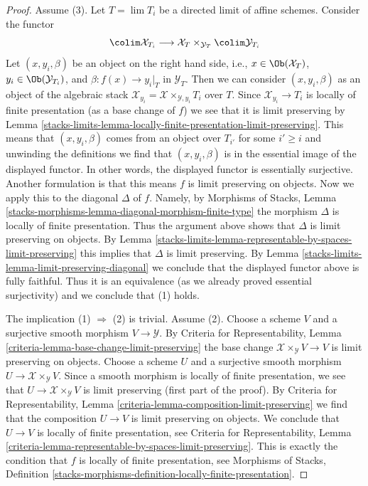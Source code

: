 \begin{proof}
Assume (3). Let $T = \lim T_i$ be a directed limit of affine schemes.
Consider the functor
$$
\colim \mathcal{X}_{T_i} \longrightarrow
\mathcal{X}_T \times_{\mathcal{Y}_T} \colim \mathcal{Y}_{T_i}
$$
Let $(x, y_i, \beta)$ be an object on the right hand side, i.e.,
$x \in \Ob(\mathcal{X}_T)$, $y_i \in \Ob(\mathcal{Y}_{T_i})$, and
$\beta : f(x) \to y_i|_T$ in $\mathcal{Y}_T$.
Then we can consider $(x, y_i, \beta)$ as an object of the
algebraic stack $\mathcal{X}_{y_i} = \mathcal{X} \times_{\mathcal{Y}, y_i} T_i$
over $T$. Since $\mathcal{X}_{y_i} \to T_i$ is locally of finite presentation
(as a base change of $f$) we see that it is limit preserving
by Lemma \ref{stacks-limits-lemma-locally-finite-presentation-limit-preserving}.
This means that $(x, y_i, \beta)$ comes from an object over $T_{i'}$
for some $i' \geq i$ and unwinding the definitions we find that
$(x, y_i, \beta)$ is in the essential image of the displayed functor.
In other words, the displayed functor is essentially surjective.
Another formulation is that this means
$f$ is limit preserving on objects.
Now we apply this to the diagonal $\Delta$ of $f$. Namely,
by Morphisms of Stacks, Lemma
\ref{stacks-morphisms-lemma-diagonal-morphism-finite-type}
the morphism $\Delta$ is locally of finite presentation.
Thus the argument above shows that $\Delta$ is limit preserving on objects.
By Lemma \ref{stacks-limits-lemma-representable-by-spaces-limit-preserving}
this implies that $\Delta$ is limit preserving.
By Lemma \ref{stacks-limits-lemma-limit-preserving-diagonal}
we conclude that the displayed functor above is fully faithful.
Thus it is an equivalence (as we already proved essential surjectivity)
and we conclude that (1) holds.

\medskip\noindent
The implication (1) $\Rightarrow$ (2) is trivial. Assume (2).
Choose a scheme $V$ and a surjective smooth morphism $V \to \mathcal{Y}$.
By Criteria for Representability, Lemma
\ref{criteria-lemma-base-change-limit-preserving}
the base change $\mathcal{X} \times_\mathcal{Y} V \to V$
is limit preserving on objects.
Choose a scheme $U$ and a surjective smooth morphism
$U \to \mathcal{X} \times_\mathcal{Y} V$.
Since a smooth morphism is locally of finite presentation,
we see that $U \to \mathcal{X} \times_\mathcal{Y} V$ is
limit preserving (first part of the proof).
By Criteria for Representability, Lemma
\ref{criteria-lemma-composition-limit-preserving}
we find that the composition $U \to V$ is limit preserving
on objects. We conclude that $U \to V$ is locally of finite presentation, see
Criteria for Representability, Lemma
\ref{criteria-lemma-representable-by-spaces-limit-preserving}.
This is exactly the condition that $f$ is locally of finite presentation, see
Morphisms of Stacks, Definition
\ref{stacks-morphisms-definition-locally-finite-presentation}.
\end{proof}

